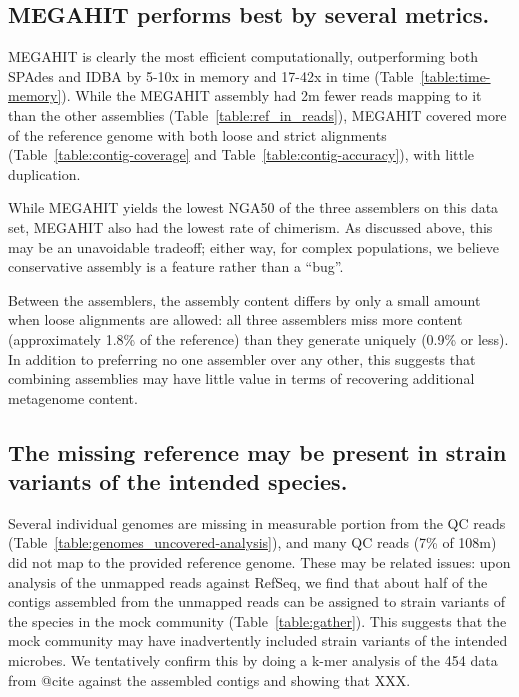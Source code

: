 \documentclass[10pt,a4paper,twocolumn]{article}
\begin{document}
\subsection*{MEGAHIT performs best by several metrics.}

MEGAHIT is clearly the most efficient computationally, outperforming
both SPAdes and IDBA by 5-10x in memory and 17-42x in time
(Table~\ref{table:time-memory}).  While the MEGAHIT assembly had 2m
fewer reads mapping to it than the other assemblies (Table~\ref{table:ref_in_reads}), MEGAHIT
covered more of the reference genome with both loose and strict
alignments (Table~\ref{table:contig-coverage} and
Table~\ref{table:contig-accuracy}), with little duplication.

While MEGAHIT yields the lowest NGA50 of the three assemblers on this
data set, MEGAHIT also had the lowest rate of chimerism.  As discussed
above, this may be an unavoidable tradeoff; either way, for complex
populations, we believe conservative assembly is a feature rather than
a ``bug''.

Between the assemblers, the assembly content differs by only a small
amount when loose alignments are allowed: all three assemblers miss
more content (approximately 1.8\% of the reference) than they generate
uniquely (0.9\% or less).  In addition to preferring no one assembler
over any other, this suggests that combining assemblies may have
little value in terms of recovering additional metagenome content.


\subsection*{The missing reference may be present in strain variants of the intended species.}

Several individual genomes are missing in measurable portion from the
QC reads (Table~\ref{table:genomes_uncovered-analysis}), and many QC
reads (7\% of 108m) did not map to the provided reference genome.
These may be related issues: upon analysis of the unmapped reads
against RefSeq, we find that about half of the contigs assembled from
the unmapped reads can be assigned to strain variants of the species
in the mock community (Table~\ref{table:gather}).  This suggests that
the mock community may have inadvertently included strain variants of
the intended microbes.  We tentatively confirm this by doing a k-mer
analysis of the 454 data from @cite against the assembled contigs and
showing that XXX.
\end{document}
